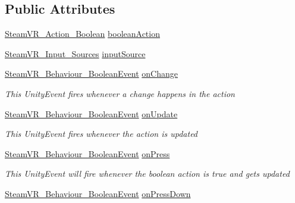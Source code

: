\subsection*{Public Attributes}
\begin{DoxyCompactItemize}
\item 
\mbox{\hyperlink{class_valve_1_1_v_r_1_1_steam_v_r___action___boolean}{Steam\+V\+R\+\_\+\+Action\+\_\+\+Boolean}} \mbox{\hyperlink{class_valve_1_1_v_r_1_1_steam_v_r___behaviour___boolean_a522b3b344157b96353bb519bced45474}{boolean\+Action}}
\item 
\mbox{\hyperlink{namespace_valve_1_1_v_r_a82e5bf501cc3aa155444ee3f0662853f}{Steam\+V\+R\+\_\+\+Input\+\_\+\+Sources}} \mbox{\hyperlink{class_valve_1_1_v_r_1_1_steam_v_r___behaviour___boolean_ad396ec574856f8332bfb9231f1199dc9}{input\+Source}}
\item 
\mbox{\hyperlink{class_valve_1_1_v_r_1_1_steam_v_r___behaviour___boolean_event}{Steam\+V\+R\+\_\+\+Behaviour\+\_\+\+Boolean\+Event}} \mbox{\hyperlink{class_valve_1_1_v_r_1_1_steam_v_r___behaviour___boolean_a732d3221d1c00ab43ff87425673c9a49}{on\+Change}}
\begin{DoxyCompactList}\small\item\em This Unity\+Event fires whenever a change happens in the action \end{DoxyCompactList}\item 
\mbox{\hyperlink{class_valve_1_1_v_r_1_1_steam_v_r___behaviour___boolean_event}{Steam\+V\+R\+\_\+\+Behaviour\+\_\+\+Boolean\+Event}} \mbox{\hyperlink{class_valve_1_1_v_r_1_1_steam_v_r___behaviour___boolean_ab7d0f9440d0b7c1f3df9cd7b21dd8104}{on\+Update}}
\begin{DoxyCompactList}\small\item\em This Unity\+Event fires whenever the action is updated \end{DoxyCompactList}\item 
\mbox{\hyperlink{class_valve_1_1_v_r_1_1_steam_v_r___behaviour___boolean_event}{Steam\+V\+R\+\_\+\+Behaviour\+\_\+\+Boolean\+Event}} \mbox{\hyperlink{class_valve_1_1_v_r_1_1_steam_v_r___behaviour___boolean_ad7c976b36eeab0c73b6232aac9d29d65}{on\+Press}}
\begin{DoxyCompactList}\small\item\em This Unity\+Event will fire whenever the boolean action is true and gets updated \end{DoxyCompactList}\item 
\mbox{\hyperlink{class_valve_1_1_v_r_1_1_steam_v_r___behaviour___boolean_event}{Steam\+V\+R\+\_\+\+Behaviour\+\_\+\+Boolean\+Event}} \mbox{\hyperlink{class_valve_1_1_v_r_1_1_steam_v_r___behaviour___boolean_abb6167286813c1edd0b8d565aa6f1e36}{on\+Press\+Down}}

\end{DoxyCompactItemize}
